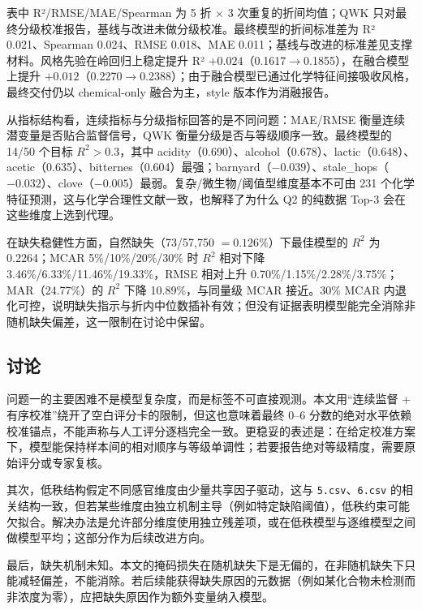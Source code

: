 表中 R²/RMSE/MAE/Spearman 为 5 折 $\times$ 3 次重复的折间均值；QWK 只对最终分级校准报告，基线与改进未做分级校准。最终模型的折间标准差为 R² 0.021、Spearman 0.024、RMSE 0.018、MAE 0.011；基线与改进的标准差见支撑材料。风格先验在岭回归上稳定提升 R² $+0.024$（0.1617$\to$0.1855），在融合模型上提升 $+0.012$（0.2270$\to$0.2388）；由于融合模型已通过化学特征间接吸收风格，最终交付仍以 chemical-only 融合为主，style 版本作为消融报告。

从指标结构看，连续指标与分级指标回答的是不同问题：MAE/RMSE 衡量连续潜变量是否贴合监督信号，QWK 衡量分级是否与等级顺序一致。最终模型的 14/50 个目标 $R^2>0.3$，其中 acidity（0.690）、alcohol（0.678）、lactic（0.648）、acetic（0.635）、bitternes（0.604）最强；barnyard（$-0.039$）、stale\_hops（$-0.032$）、clove（$-0.005$）最弱。复杂/微生物/阈值型维度基本不可由 231 个化学特征预测，这与化学合理性文献一致，也解释了为什么 Q2 的纯数据 Top-3 会在这些维度上选到代理。


在缺失稳健性方面，自然缺失（73/57,750 $=0.126\%$）下最佳模型的 $R^2$ 为 0.2264；MCAR 5\%/10\%/20\%/30\% 时 $R^2$ 相对下降 3.46\%/6.33\%/11.46\%/19.33\%，RMSE 相对上升 0.70\%/1.15\%/2.28\%/3.75\%；MAR（24.77\%）的 $R^2$ 下降 10.89\%，与同量级 MCAR 接近。30\% MCAR 内退化可控，说明缺失指示与折内中位数插补有效；但没有证据表明模型能完全消除非随机缺失偏差，这一限制在讨论中保留。


\subsection{讨论}

问题一的主要困难不是模型复杂度，而是标签不可直接观测。本文用“连续监督 + 有序校准”绕开了空白评分卡的限制，但这也意味着最终 0--6 分数的绝对水平依赖校准锚点，不能声称与人工评分逐档完全一致。更稳妥的表述是：在给定校准方案下，模型能保持样本间的相对顺序与等级单调性；若要报告绝对等级精度，需要原始评分或专家复核。

其次，低秩结构假定不同感官维度由少量共享因子驱动，这与 \texttt{5.csv}、\texttt{6.csv} 的相关结构一致，但若某些维度由独立机制主导（例如特定缺陷阈值），低秩约束可能欠拟合。解决办法是允许部分维度使用独立残差项，或在低秩模型与逐维模型之间做模型平均；这部分作为后续改进方向。

最后，缺失机制未知。本文的掩码损失在随机缺失下是无偏的，在非随机缺失下只能减轻偏差，不能消除。若后续能获得缺失原因的元数据（例如某化合物未检测而非浓度为零），应把缺失原因作为额外变量纳入模型。
